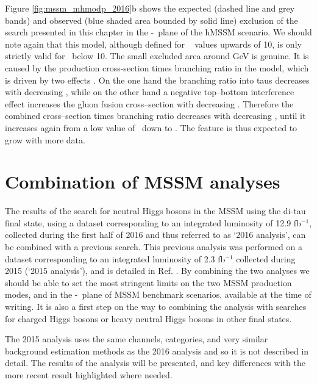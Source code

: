 Figure \ref{fig:mssm_mhmodp_2016}b shows the expected (dashed line and grey bands)
and observed (blue shaded area bounded by solid line) exclusion of the search
presented in this chapter in the \mA-\tanb~plane of the hMSSM scenario. 
We should note again that this model, although defined for \tanb~ values
upwards of 10, is only strictly valid for \tanb~below 10.
The small excluded area around  GeV is genuine. It is caused by the 
production cross-section times branching ratio in the model, which is driven by
two effects \cite{CMS-PAS-HIG-16-007}. On the one hand the branching ratio into taus decreases with decreasing
\tanb, while on the other hand a negative top--bottom interference effect increases the
gluon fusion cross--section with decreasing \tanb. Therefore the
combined cross--section times branching ratio decreases with decreasing \tanb, until it
increases again from a low value of \tanb~down to . The feature is 
thus expected to grow with more data.

\chapter{Combination of MSSM analyses}
\label{sec:mssm_combination}
The results of the search for neutral Higgs bosons in the MSSM using the di-tau
final state, using a dataset
corresponding to an integrated luminosity of 12.9 fb$^{-1}$, collected during the
first half of 2016 and thus referred to as `2016 analysis', can be combined 
with a previous search. This previous analysis
was performed on a dataset corresponding to an integrated luminosity of 2.3 fb$^{-1}$
collected during 2015 (`2015 analysis'), and is detailed in Ref. \cite{CMS-PAS-HIG-16-006}.
By combining the two analyses we should be able to set the most stringent
limits on the two MSSM production modes, and in the \mA-\tanb~plane of 
MSSM benchmark scenarios, available at the time of writing. It is also
a first step on the way to combining the \AHtotautau analysis with
searches for charged Higgs bosons or heavy neutral Higgs bosons in 
other final states. 

The 2015 analysis uses the same channels, categories, and very
similar background estimation methods as the 2016 analysis and so
it is not described in detail. The results of the analysis will 
be presented, and key differences with the more recent result highlighted
where needed.

